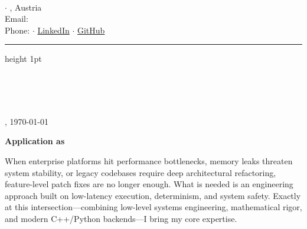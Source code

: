 \documentclass[11pt,a4paper]{article}
\begin{document}
\begin{minipage}[t]{0.55\textwidth}
    {\Large \bfseries \color{primary} \meinName}\\[0.2em]
    {\small \color{accent} \bfseries \stellenTitel}
\end{minipage}
\begin{minipage}[t]{0.45\textwidth}
    \raggedleft \footnotesize \color{textgray}
    \meineStrasse $\cdot$ \meinOrt, Austria\\
    Email: \href{mailto:\meineEmail}{\meineEmail}\\
    Phone: \meineTel $\cdot$ \href{\meinLinkedin}{LinkedIn} $\cdot$ \href{\meinGithub}{GitHub}
\end{minipage}

\vspace{0.8em}
\color{accent}\hrule height 1pt
\vspace{1.0em}

\begin{minipage}[t]{0.55\textwidth}
    \color{primary} \small
    \textbf{\firmenName}\\[0.15em]
    \ansprechPartner\\[0.15em]
    \firmenAdresse\\[0.15em]
\end{minipage}
\begin{minipage}[t]{0.45\textwidth}
    \raggedleft \small \color{textgray}
    \meinOrt, \today
\end{minipage}

\vspace{1.2em}

\vspace{0.8cm}
{\Large\bfseries\color{primary} Application as \stellenTitel}


\vspace{0.6em}

\color{primary} \small

\anrede

When enterprise platforms hit performance bottlenecks, memory leaks threaten system stability, or legacy codebases require deep architectural refactoring, feature-level patch fixes are no longer enough. What is needed is an engineering approach built on low-latency execution, determinism, and system safety. Exactly at this intersection—combining low-level systems engineering, mathematical rigor, and modern C++/Python backends—I bring my core expertise.
\end{document}
